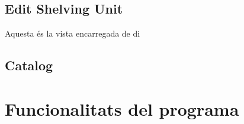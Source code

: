 \documentclass[a4paper,12pt]{article}
\begin{document}
	\newpage
	\subsection{Edit Shelving Unit}
	
	Aquesta és la vista encarregada de di
	
	\newpage
	\subsection{Catalog}
	
	
	\newpage
	\section{Funcionalitats del programa}
	
\end{document}
